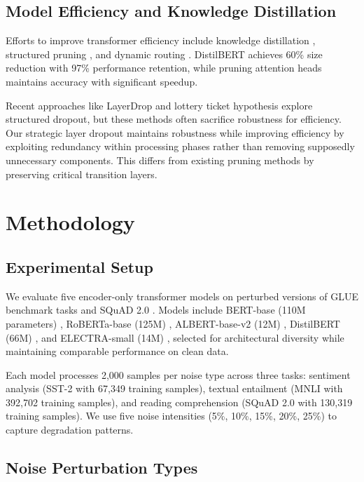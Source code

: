 \documentclass{article}
\begin{document}
\subsection{Model Efficiency and Knowledge Distillation}

Efforts to improve transformer efficiency include knowledge distillation \cite{sanh2019distilbert}, structured pruning \cite{michel2019sixteen}, and dynamic routing \cite{wang2020dual}. DistilBERT achieves 60\% size reduction with 97\% performance retention, while pruning attention heads maintains accuracy with significant speedup.

Recent approaches like LayerDrop \cite{fan2020reducing} and lottery ticket hypothesis \cite{zhou2020lottery} explore structured dropout, but these methods often sacrifice robustness for efficiency. Our strategic layer dropout maintains robustness while improving efficiency by exploiting redundancy within processing phases rather than removing supposedly unnecessary components. This differs from existing pruning methods \cite{li2023constraint,yang2024laco} by preserving critical transition layers.

\section{Methodology}

\subsection{Experimental Setup}

We evaluate five encoder-only transformer models on perturbed versions of GLUE benchmark tasks \cite{wang2018glue} and SQuAD 2.0 \cite{rajpurkar2018squad}. Models include BERT-base (110M parameters) \cite{devlin2019bert}, RoBERTa-base (125M) \cite{liu2019roberta}, ALBERT-base-v2 (12M) \cite{lan2020albert}, DistilBERT (66M) \cite{sanh2019distilbert}, and ELECTRA-small (14M) \cite{clark2020electra}, selected for architectural diversity while maintaining comparable performance on clean data.

Each model processes 2,000 samples per noise type across three tasks: sentiment analysis (SST-2 with 67,349 training samples), textual entailment (MNLI with 392,702 training samples), and reading comprehension (SQuAD 2.0 with 130,319 training samples). We use five noise intensities (5\%, 10\%, 15\%, 20\%, 25\%) to capture degradation patterns.

\subsection{Noise Perturbation Types}
\end{document}
